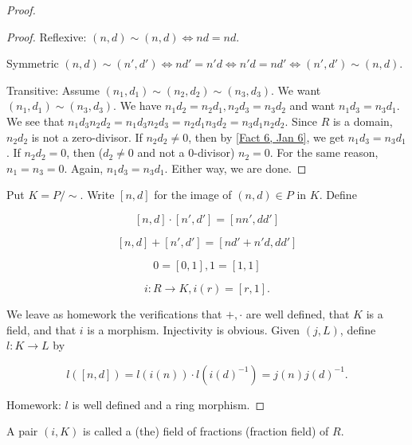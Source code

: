 \begin{proof}
\begin{claim}
\begin{proof}
Reflexive: $(n,d)\sim(n,d)\iff nd=nd.$

Symmetric $(n,d)\sim(n',d')\iff nd'=n'd\iff n'd=nd'\iff (n',d')\sim (n,d).$

Transitive: Assume $(n_1,d_1)\sim(n_2,d_2)\sim(n_3,d_3)$. We want $(n_1,d_1)\sim(n_3,d_3).$
We have $n_1d_2=n_2d_1,n_2d_3=n_3d_2$ and want $n_1d_3=n_3d_1.$
We see that $n_1d_3 n_2d_2=n_1d_3n_2d_3=n_2d_1n_3d_2=n_3d_1n_2d_2.$
Since $R$ is a domain, $n_2d_2$ is not a zero-divisor. If $n_2d_2\ne 0$, then by \ref{Fact 6, Jan 6}, we get $n_1d_3=n_3d_1$. If $n_2d_2=0$, then ($d_2\ne 0$ and not a 0-divisor) $n_2=0$. For the same reason, $n_1=n_3=0.$ Again, $n_1d_3=n_3d_1$. Either way, we are done.
\end{proof}
\end{claim}

Put $K=P/\sim.$ Write $[n,d]$ for the image of $(n,d)\in P$ in $K$. Define

$$[n,d]\cdot[n',d']=[nn',dd']$$

$$[n,d]+[n',d']=[nd'+n'd,dd']$$

$$0=[0,1],1=[1,1]$$

$$i:R\rightarrow K, i(r)=[r,1].$$

We leave as homework the verifications that $+,\cdot$ are well defined, that $K$ is a field, and that $i$ is a morphism. Injectivity is obvious. Given $(j,L)$, define $l:K\longrightarrow L$ by

$$l([n,d])=l(i(n))\cdot l(i(d)^{-1})=j(n)j(d)^{-1}.$$

Homework: $l$ is well defined and a ring morphism.

\end{proof}

\begin{defn}\label{Defn 2, Jan 11}

A pair $(i,K)$ is called a (the) field of fractions (fraction field) of $R$.

\end{defn}

